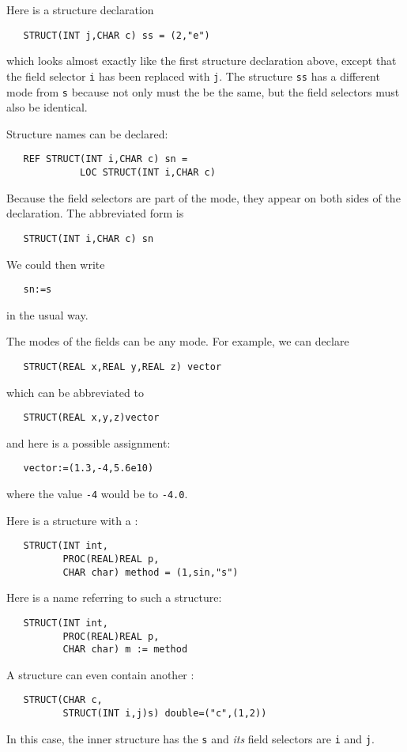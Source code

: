 Here is a structure declaration
\begin{verbatim}
   STRUCT(INT j,CHAR c) ss = (2,"e")
\end{verbatim}
\noindent
which looks almost exactly like the first structure declaration
above, except that the field selector \verb|i| has been replaced with
\verb|j|.  The structure \verb|ss| has a different mode from \verb|s|
because not only must the  be
the same, but the field selectors must also be identical.

Structure names can be declared:
\begin{verbatim}
   REF STRUCT(INT i,CHAR c) sn =
             LOC STRUCT(INT i,CHAR c)
\end{verbatim}
\noindent
Because the field selectors are part of the mode, they appear on both
sides of the declaration. The abbreviated form is
\begin{verbatim}
   STRUCT(INT i,CHAR c) sn
\end{verbatim}
\noindent
We could then write
\begin{verbatim}
   sn:=s
\end{verbatim}
\noindent
in the usual way.

The modes of the fields can be any mode.  For example, we can declare
\begin{verbatim}
   STRUCT(REAL x,REAL y,REAL z) vector
\end{verbatim}
\noindent
which can be abbreviated to
\begin{verbatim}
   STRUCT(REAL x,y,z)vector
\end{verbatim}
\noindent
and here is a possible assignment:
\begin{verbatim}
   vector:=(1.3,-4,5.6e10)
\end{verbatim}
\noindent
where the value \verb|-4| would be 
to \verb|-4.0|.

Here is a structure with a :
\begin{verbatim}
   STRUCT(INT int,
          PROC(REAL)REAL p,
          CHAR char) method = (1,sin,"s")
\end{verbatim}
\noindent
Here is a name referring to such a structure:
\begin{verbatim}
   STRUCT(INT int,
          PROC(REAL)REAL p,
          CHAR char) m := method
\end{verbatim}
\noindent
A structure can even contain another
:
\begin{verbatim}
   STRUCT(CHAR c,
          STRUCT(INT i,j)s) double=("c",(1,2))
\end{verbatim}
\noindent
In this case, the inner structure has the 
\verb|s| and \textit{its\/} field selectors are \verb|i| and \verb|j|.

